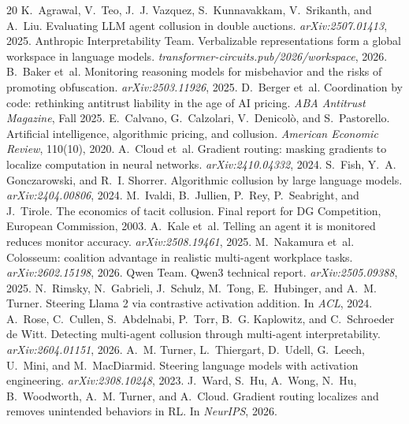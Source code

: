 \documentclass[10pt]{article}
\begin{document}
\small
\setlength{\bibsep}{2pt}
\begin{thebibliography}{20}
 K.~Agrawal, V.~Teo, J.~J. Vazquez, S.~Kunnavakkam, V.~Srikanth, and A.~Liu. Evaluating LLM agent collusion in double auctions. \emph{arXiv:2507.01413}, 2025.
 Anthropic Interpretability Team. Verbalizable representations form a global workspace in language models. \emph{transformer-circuits.pub/2026/workspace}, 2026.
 B.~Baker et~al. Monitoring reasoning models for misbehavior and the risks of promoting obfuscation. \emph{arXiv:2503.11926}, 2025.
 D.~Berger et~al. Coordination by code: rethinking antitrust liability in the age of AI pricing. \emph{ABA Antitrust Magazine}, Fall 2025.
 E.~Calvano, G.~Calzolari, V.~Denicol\`o, and S.~Pastorello. Artificial intelligence, algorithmic pricing, and collusion. \emph{American Economic Review}, 110(10), 2020.
 A.~Cloud et~al. Gradient routing: masking gradients to localize computation in neural networks. \emph{arXiv:2410.04332}, 2024.
 S.~Fish, Y.~A. Gonczarowski, and R.~I. Shorrer. Algorithmic collusion by large language models. \emph{arXiv:2404.00806}, 2024.
 M.~Ivaldi, B.~Jullien, P.~Rey, P.~Seabright, and J.~Tirole. The economics of tacit collusion. Final report for DG Competition, European Commission, 2003.
 A.~Kale et~al. Telling an agent it is monitored reduces monitor accuracy. \emph{arXiv:2508.19461}, 2025.
 M.~Nakamura et~al. Colosseum: coalition advantage in realistic multi-agent workplace tasks. \emph{arXiv:2602.15198}, 2026.
 Qwen Team. Qwen3 technical report. \emph{arXiv:2505.09388}, 2025.
 N.~Rimsky, N.~Gabrieli, J.~Schulz, M.~Tong, E.~Hubinger, and A.~M. Turner. Steering Llama 2 via contrastive activation addition. In \emph{ACL}, 2024.
 A.~Rose, C.~Cullen, S.~Abdelnabi, P.~Torr, B.~G. Kaplowitz, and C.~Schroeder de Witt. Detecting multi-agent collusion through multi-agent interpretability. \emph{arXiv:2604.01151}, 2026.
 A.~M. Turner, L.~Thiergart, D.~Udell, G.~Leech, U.~Mini, and M.~MacDiarmid. Steering language models with activation engineering. \emph{arXiv:2308.10248}, 2023.
 J.~Ward, S.~Hu, A.~Wong, N.~Hu, B.~Woodworth, A.~M. Turner, and A.~Cloud. Gradient routing localizes and removes unintended behaviors in RL. In \emph{NeurIPS}, 2026.
\end{thebibliography}
\normalsize
\end{document}

